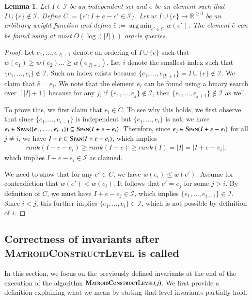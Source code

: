 \documentclass[11pt]{article}
\newtheorem{lemma}[theorem]{Lemma}
\newcommand{\mI}{{\mathcal{I}}}
\DeclareMathOperator{\argmin}{arg\,min}
\newcommand{\MatroidConstLevel}{\textsc{MatroidConstructLevel}}
\newcommand{\spn}{{\textsc{Span}}}
\newcommand{\rank}{rank}
\begin{document}
\begin{lemma}\label{lm:find_min} Let $I \in \mI$ be an independent set and $e$ be an element such that $I \cup \{e\} \notin \mI$.
  Define $C := \{e': I + e - e' \in \mI\}$.
  Let $w : I \cup \{e\} \to \mathbb{R}^{\ge 0}$ be an arbitrary weight function and
  define $\hat{e} := \argmin_{e'\in C} w(e')$. The element $\hat{e}$ can be found
  using at most $O(\log(|I|))$ oracle queries.
\end{lemma}
\begin{proof}
  Let $e_1, \dots, e_{|I| + 1}$ denote an ordering of $I \cup \{e\}$
  such that $w(e_1) \ge w(e_2) \dots \ge w(e_{|I| + 1})$. 
  Let $i$ denote the smallest index such that
  $\{e_1, \dots, e_{i}\} \notin \mI$. Such an index exists
  because $\{e_1, \dots, e_{|I| + 1}\} = I \cup \{e\} \notin \mI$. 
  We claim that $\hat{e} = e_i$.
  We note that the element $e_i$ can be found
  using a binary search over $[|I| + 1]$ because
  for any $j$,
  if $\{e_1, \dots, e_j\} \notin \mI$, then
  $\{e_1, \dots, e_{j+1}\} \notin \mI$ as well.

  To prove this, we first claim that $e_i \in C$. To
  see why this holds, we first observe that
  since $\{e_1, \dots, e_{i-1}\}$ is independent but
  $\{e_1, \dots, e_i\}$ is not, we have
  $e_i \in \spn(\{e_1, \dots, e_{i-1}\}) \subseteq \spn(I + e - e_i)$.
  Therefore, since $e_j \in \spn(I + e - e_i)$ for all $j\ne i$, we have
  $I + e \subseteq \spn(I + e - e_i)$, which implies
  \begin{align*}
    \rank(I + e - e_i) \ge \rank(I + e) \ge \rank(I) = |I|
    = |I+ e - e_i|,
  \end{align*}
  which implies $I + e - e_i \in \mI$ as claimed.

  We need to show that for any $e' \in C$, we have $w(e_i) \le w(e')$. 
  Assume for contradiction that $w(e') < w(e_i)$. It follows that
  $e' = e_j$ for some $j > i$. By definition of $C$,
  we must have
  $I + e - e_j \in \mI$, which implies
  $\{e_1, \dots, e_{j-1}\} \in\mI$. Since $i < j$, this further implies
  $\{e_1, \dots, e_i\} \in  \mI$, which is not possible by definition of $i$.
\end{proof}

\subsection{Correctness of invariants after \MatroidConstLevel{} is called}
\label{sec:level:proofs:matroid}

In this section, we focus on the previously defined invariants at the end of the execution of the algorithm $\MatroidConstLevel{}(j)$. 
We first provide a definition explaining what we mean by stating that level invariants partially hold. 
\end{document}
